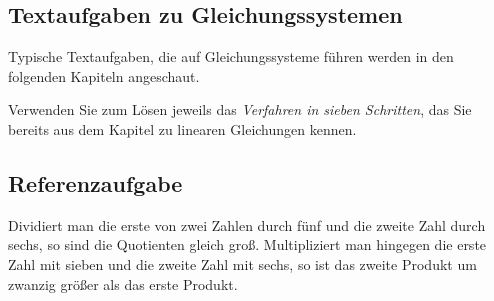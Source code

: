 
\subsection{Textaufgaben zu Gleichungssystemen}


Typische Textaufgaben, die auf Gleichungssysteme führen werden in den folgenden Kapiteln angeschaut.

Verwenden Sie zum Lösen jeweils das \textit{Verfahren in sieben
Schritten}, das Sie bereits aus dem Kapitel zu linearen Gleichungen kennen.
\newpage
\subsection*{Referenzaufgabe}
Dividiert man die erste von zwei Zahlen durch fünf und die zweite Zahl
durch sechs, so sind die Quotienten gleich groß. Multipliziert man
hingegen die erste Zahl mit sieben und die zweite Zahl mit sechs, so
ist das zweite Produkt um zwanzig größer als das erste Produkt.


  \newpage
  
